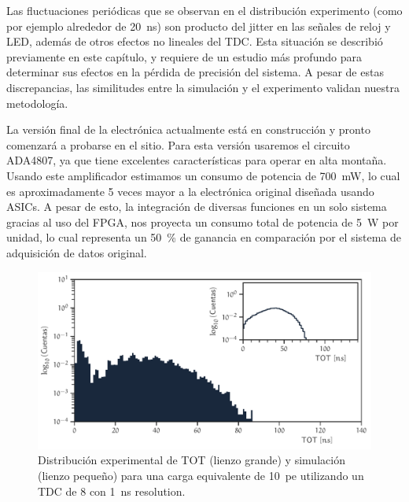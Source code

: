 Las fluctuaciones periódicas que se observan en el distribución experimento (como por ejemplo alrededor de \SI{20}{\ns}) son producto del jitter en las señales de reloj y LED, además de otros efectos no lineales del TDC. Esta situación se describió previamente en este capítulo, y requiere de un estudio más profundo para determinar sus efectos en la pérdida de precisión del sistema. A pesar de estas discrepancias, las similitudes entre la simulación y el experimento validan nuestra metodología.

La versión final de la electrónica actualmente está en construcción y pronto comenzará a probarse en el sitio. Para esta versión usaremos el circuito ADA4807, ya que tiene excelentes características para operar en alta montaña. Usando este amplificador estimamos un consumo de potencia de \SI{700}{\mW}, lo cual es aproximadamente \num{5} veces mayor a la electrónica original diseñada usando ASICs. A pesar de esto, la integración de diversas funciones en un solo sistema gracias al uso del FPGA, nos proyecta un consumo total de potencia de \SI{5}{\W} por unidad, lo cual representa un \SI{50}{\percent} de ganancia en comparación por el sistema de adquisición de datos original.

\begin{figure}
        \centering
        \includegraphics[width=\textwidth]{tdc_sim-exp.pdf}
        \caption{Distribución experimental de TOT (lienzo grande) y simulación (lienzo pequeño) para una carga equivalente de \SI{10}{pe} utilizando un TDC de \SI{8}{\bit} con \SI{1}{\ns} resolution.}
        \label{fig:tdc-simexp}
\end{figure}
